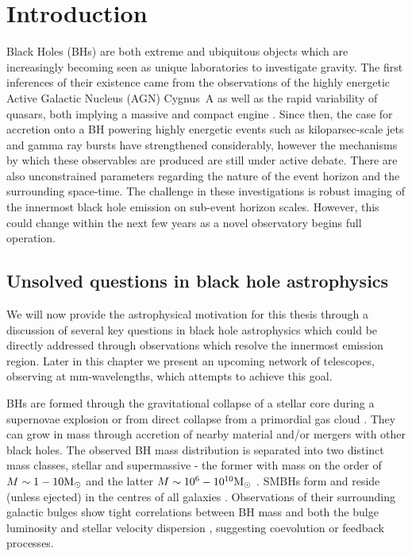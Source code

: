 \chapter{Introduction}
Black Holes (BHs) are both extreme and ubiquitous objects which are increasingly becoming seen as unique laboratories to investigate gravity. The first inferences of their existence came from the observations of the highly energetic Active Galactic Nucleus (AGN) Cygnus~A as well as the rapid variability of quasars, both implying a massive and compact engine \citep[e.g.][and references therein]{Narayan_2013}. Since then, the case for accretion onto a BH powering highly energetic events such as kiloparsec-scale jets and gamma ray bursts have strengthened considerably, however the mechanisms by which these observables are produced are still under active debate. There are also unconstrained parameters regarding the nature of the event horizon and the surrounding space-time. The challenge in these investigations is robust imaging of the innermost black hole emission on sub-event horizon scales. However, this could change within the next few years as a novel observatory begins full operation.

\section{Unsolved questions in black hole astrophysics}\label{sec:unsolved_qs}

We will now provide the astrophysical motivation for this thesis through a discussion of several key questions in black hole astrophysics which could be directly addressed through observations which resolve the innermost emission region. Later in this chapter we present an upcoming network of telescopes, observing at mm-wavelengths, which attempts to achieve this goal. 


BHs are formed through the gravitational collapse of a stellar core during a supernovae explosion or from direct collapse from a primordial gas cloud \citep[e.g.][]{Begelman_2006}. They can grow in mass through accretion of nearby material and/or mergers with other black holes. The observed BH mass distribution is separated into two distinct mass classes, stellar and supermassive - the former with mass on the order of $M \sim 1 - 10 {\rm M_\odot}$ and the latter $M \sim 10^6 - 10^{10} {\rm M_\odot}$ \citep{Falcke_2013}. SMBHs form and reside (unless ejected) in the centres of all galaxies \citep{Kormendy_1995}. Observations of their surrounding galactic bulges show tight correlations between BH mass and both the bulge luminosity and stellar velocity dispersion \citep[e.g.][]{Magorrian_1998,Gebhardt_2000}, suggesting coevolution or feedback processes. 


